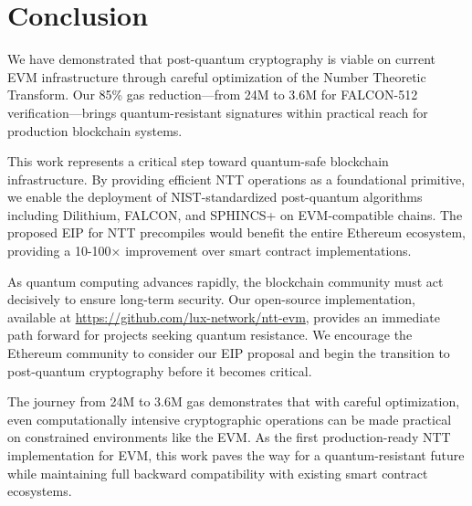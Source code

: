 \section{Conclusion}


We have demonstrated that post-quantum cryptography is viable on current EVM infrastructure through careful optimization of the Number Theoretic Transform. Our 85\% gas reduction—from 24M to 3.6M for FALCON-512 verification—brings quantum-resistant signatures within practical reach for production blockchain systems.

This work represents a critical step toward quantum-safe blockchain infrastructure. By providing efficient NTT operations as a foundational primitive, we enable the deployment of NIST-standardized post-quantum algorithms including Dilithium, FALCON, and SPHINCS+ on EVM-compatible chains. The proposed EIP for NTT precompiles would benefit the entire Ethereum ecosystem, providing a 10-100× improvement over smart contract implementations.

As quantum computing advances rapidly, the blockchain community must act decisively to ensure long-term security. Our open-source implementation, available at \url{https://github.com/lux-network/ntt-evm}, provides an immediate path forward for projects seeking quantum resistance. We encourage the Ethereum community to consider our EIP proposal and begin the transition to post-quantum cryptography before it becomes critical.

The journey from 24M to 3.6M gas demonstrates that with careful optimization, even computationally intensive cryptographic operations can be made practical on constrained environments like the EVM. As the first production-ready NTT implementation for EVM, this work paves the way for a quantum-resistant future while maintaining full backward compatibility with existing smart contract ecosystems.

